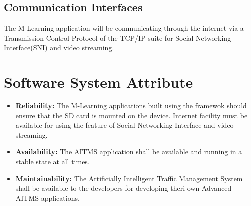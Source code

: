 \documentclass[openany,12pt]{report}
\begin{document}
\subsection{Communication Interfaces}
\hspace*{0.5in}The M-Learning application will be communicating through the internet via a Transmission Control Protocol of the TCP/IP suite for Social Networking Interface(SNI) and video streaming.

\section{Software System Attribute}
\begin{itemize}
\item{\textbf{Reliability:} The M-Learning applications built using the framewok should ensure that the SD card is mounted on the device. Internet facility must be available for using the feature of Social Networking Interface and video streaming.}
\item{\textbf{Availability:} The AITMS application shall be available and running in a stable state at all times.}
\item{\textbf{Maintainability:}  The Artificially Intelligent Traffic Management System shall be available to the developers for developing theri own Advanced AITMS applications.}

\end{itemize}
\end{document}
